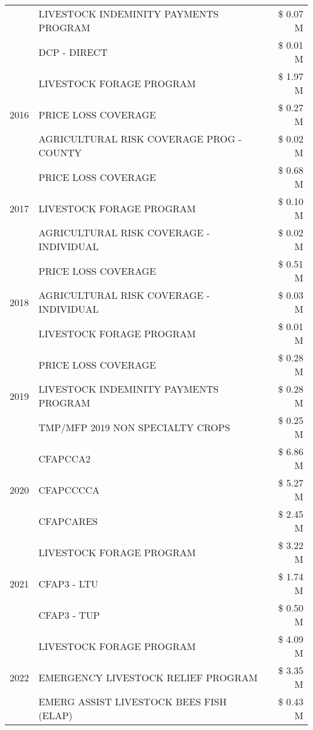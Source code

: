 \begin{tabular}{llr}
 & LIVESTOCK INDEMINITY PAYMENTS PROGRAM & \$ 0.07 M \\
 & DCP - DIRECT & \$ 0.01 M \\
\cline{1-3}
\multirow[t]{3}{*}{2016} & LIVESTOCK FORAGE PROGRAM & \$ 1.97 M \\
 & PRICE LOSS COVERAGE & \$ 0.27 M \\
 & AGRICULTURAL RISK COVERAGE PROG - COUNTY & \$ 0.02 M \\
\cline{1-3}
\multirow[t]{3}{*}{2017} & PRICE LOSS COVERAGE & \$ 0.68 M \\
 & LIVESTOCK FORAGE PROGRAM & \$ 0.10 M \\
 & AGRICULTURAL RISK COVERAGE - INDIVIDUAL & \$ 0.02 M \\
\cline{1-3}
\multirow[t]{3}{*}{2018} & PRICE LOSS COVERAGE & \$ 0.51 M \\
 & AGRICULTURAL RISK COVERAGE - INDIVIDUAL & \$ 0.03 M \\
 & LIVESTOCK FORAGE PROGRAM & \$ 0.01 M \\
\cline{1-3}
\multirow[t]{3}{*}{2019} & PRICE LOSS COVERAGE & \$ 0.28 M \\
 & LIVESTOCK INDEMINITY PAYMENTS PROGRAM & \$ 0.28 M \\
 & TMP/MFP 2019 NON SPECIALTY CROPS & \$ 0.25 M \\
\cline{1-3}
\multirow[t]{3}{*}{2020} & CFAPCCA2 & \$ 6.86 M \\
 & CFAPCCCCA & \$ 5.27 M \\
 & CFAPCARES & \$ 2.45 M \\
\cline{1-3}
\multirow[t]{3}{*}{2021} & LIVESTOCK FORAGE PROGRAM & \$ 3.22 M \\
 & CFAP3 - LTU & \$ 1.74 M \\
 & CFAP3 - TUP & \$ 0.50 M \\
\cline{1-3}
\multirow[t]{3}{*}{2022} & LIVESTOCK FORAGE PROGRAM & \$ 4.09 M \\
 & EMERGENCY LIVESTOCK RELIEF PROGRAM & \$ 3.35 M \\
 & EMERG ASSIST LIVESTOCK BEES FISH (ELAP) & \$ 0.43 M \\
\cline{1-3}
\bottomrule
\end{tabular}
